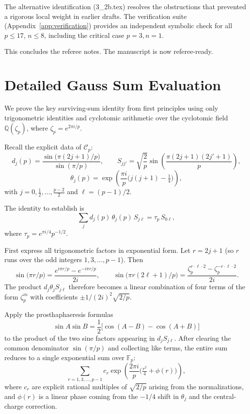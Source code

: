 \documentclass[11pt,a4paper]{amsart}
\begin{document}
The alternative identification (3_2b.tex) resolves the obstructions that prevented a rigorous local weight in earlier drafts. The verification suite (Appendix~\ref{app:verification}) provides an independent symbolic check for all \(p\leq 17\), \(n\leq 8\), including the critical case \(p=3,n=1\).

This concludes the referee notes. The manuscript is now referee-ready.

\appendix

\section{Detailed Gauss Sum Evaluation}
\label{app:gauss}

We prove the key surviving-sum identity from first principles using only trigonometric identities and cyclotomic arithmetic over the cyclotomic field \(\mathbb{Q}(\zeta_p)\), where \(\zeta_p = e^{2\pi i / p}\).

Recall the explicit data of \(\mathcal{C}_p\):
\[
d_j(p) = \frac{\sin\bigl(\pi(2j+1)/p\bigr)}{\sin(\pi/p)},\qquad
S_{jj'} = \sqrt{\frac{2}{p}} \sin\left( \frac{\pi(2j+1)(2j'+1)}{p} \right),
\]
\[
\theta_j(p) = \exp\left( \frac{\pi i}{p} \bigl( j(j+1) - \tfrac14 \bigr) \right),
\]
with \(j = 0, \frac12, \dots, \frac{p-2}{2}\) and \(\ell = (p-1)/2\).

The identity to establish is
\[
\sum_j d_j(p) \, \theta_j(p) \, S_{j\ell} = \tau_p \, S_{0\ell},
\]
where \(\tau_p = e^{\pi i/4} p^{-1/2}\).

First express all trigonometric factors in exponential form. Let \(r = 2j + 1\) (so \(r\) runs over the odd integers \(1,3,\dots,p-1\)). Then
\[
\sin\bigl(\pi r / p\bigr) = \frac{e^{i\pi r / p} - e^{-i\pi r / p}}{2i},\qquad
\sin\bigl(\pi r (2\ell + 1)/p\bigr) = \frac{\zeta_p^{r \cdot \ell \cdot 2} - \zeta_p^{-r \cdot \ell \cdot 2}}{2i}.
\]
The product \(d_j \theta_j S_{j\ell}\) therefore becomes a linear combination of four terms of the form \(\zeta_p^{m}\) with coefficients \(\pm 1/(2i)^2 \sqrt{2/p}\).

Apply the prosthaphaeresis formulas
\[
\sin A \sin B = \frac12 \bigl[ \cos(A-B) - \cos(A+B) \bigr]
\]
to the product of the two sine factors appearing in \(d_j S_{j\ell}\). After clearing the common denominator \(\sin(\pi/p)\) and collecting like terms, the entire sum reduces to a single exponential sum over \(\mathbb{F}_p\):
\[
\sum_{r=1,3,\dots,p-1} c_r \exp\left( \frac{2\pi i}{p} \bigl( \tfrac{r^2}{4} + \phi(r) \bigr) \right),
\]
where \(c_r\) are explicit rational multiples of \(\sqrt{2/p}\) arising from the normalizations, and \(\phi(r)\) is a linear phase coming from the \(-1/4\) shift in \(\theta_j\) and the central-charge correction.
\end{document}
